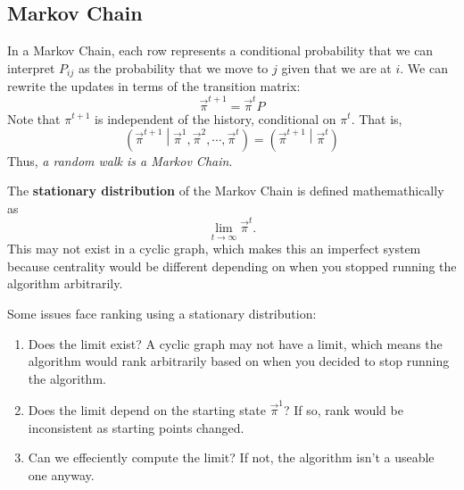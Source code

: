 \documentclass[titlepage, 12pt, leqno]{article}
\begin{document}
\subsection{Markov Chain}
In a Markov Chain, each row represents a conditional probability that we can 
interpret $P_{ij}$ as the probability that we move to $j$ given that we are at
$i$. We can rewrite the updates in terms of the transition matrix:
\[
    \vec\pi^{t+1} = \vec\pi^{t}P
\]
Note that $\pi^{t+1}$ is independent of the history, conditional on $\pi^{t}$.
That is,
\[
    \left( \vec\pi^{t+1} \middle| \vec\pi^{1}, \vec\pi^{2}, 
    \cdots ,\vec\pi^{t}\right) =
    \left(\vec\pi^{t+1} \middle| \vec\pi^{t}\right)
\]
Thus, \textit{a random walk is a Markov Chain}. 
\begin{definition}
    The \textbf{stationary distribution} of the Markov Chain is defined 
    mathemathically as
    \[
    \lim_{t \to \infty} \vec \pi^{t}.
    \]
    This may not exist in a cyclic graph, which makes this an imperfect system
    because centrality would be different depending on when you stopped running
    the algorithm arbitrarily.
\end{definition}

Some issues face ranking using a stationary distribution:
\begin{enumerate}
    \item Does the limit exist? A cyclic graph may not have a limit, which means
        the algorithm would rank arbitrarily based on when you decided to stop
        running the algorithm.
    \item Does the limit depend on the starting state $\vec \pi^{1}$? If so,
        rank would be inconsistent as starting points changed.
    \item Can we effeciently compute the limit? If not, the algorithm isn't a
        useable one anyway.
\end{enumerate}
\end{document}
